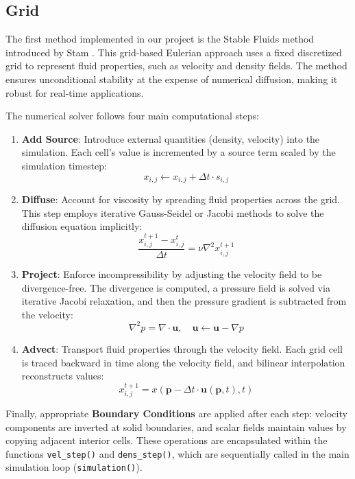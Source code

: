 \subsection{Grid}

The first method implemented in our project is the Stable Fluids method introduced by Stam  \citep{stam2023stable}. This grid-based Eulerian approach uses a fixed discretized grid to represent fluid properties, such as velocity and density fields. The method ensures unconditional stability at the expense of numerical diffusion, making it robust for real-time applications.

The numerical solver follows four main computational steps:

\begin{enumerate}
\item \textbf{Add Source}: Introduce external quantities (density, velocity) into the simulation. Each cell's value is incremented by a source term scaled by the simulation timestep:
\[
x_{i,j} \leftarrow x_{i,j} + \Delta t \cdot s_{i,j}
\]

\item \textbf{Diffuse}: Account for viscosity by spreading fluid properties across the grid. This step employs iterative Gauss-Seidel or Jacobi methods to solve the diffusion equation implicitly:
\[
\frac{x_{i,j}^{t+1} - x_{i,j}^{t}}{\Delta t} = \nu \nabla^2 x_{i,j}^{t+1}
\]

\item \textbf{Project}: Enforce incompressibility by adjusting the velocity field to be divergence-free. The divergence is computed, a pressure field is solved via iterative Jacobi relaxation, and then the pressure gradient is subtracted from the velocity:
\[
\nabla^2 p = \nabla \cdot \mathbf{u}, \quad \mathbf{u} \leftarrow \mathbf{u} - \nabla p
\]

\item \textbf{Advect}: Transport fluid properties through the velocity field. Each grid cell is traced backward in time along the velocity field, and bilinear interpolation reconstructs values:
\[
x_{i,j}^{t+1} = x(\mathbf{p} - \Delta t \cdot \mathbf{u}(\mathbf{p},t), t)
\]
\end{enumerate}

Finally, appropriate \textbf{Boundary Conditions} are applied after each step: velocity components are inverted at solid boundaries, and scalar fields maintain values by copying adjacent interior cells. These operations are encapsulated within the functions \texttt{vel\_step()} and \texttt{dens\_step()}, which are sequentially called in the main simulation loop (\texttt{simulation()}).
